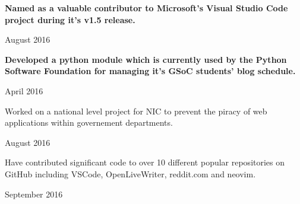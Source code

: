 
\begin{cvachievements}

\cvachievement%
  {%
    \begin{cvachievementitems}
      \item{\textbf{Named as a valuable contributor to Microsoft's Visual Studio Code
            project during it's v1.5 release.}} %
    \end{cvachievementitems}
  }
  {August 2016} %

\cvachievement%
  {%
    \begin{cvachievementitems}
      \item{\textbf{Developed a python module which is currently used by the Python
            Software Foundation for managing it's GSoC students' blog schedule.}} %
    \end{cvachievementitems}
  }
  {April 2016} %

\cvachievement%
  {%
    \begin{cvachievementitems}
      \item{Worked on a national level project for NIC to prevent the piracy of
            web applications within governement departments.} %
    \end{cvachievementitems}
  }
  {August 2016} %

\cvachievement%
  {%
    \begin{cvachievementitems}
      \item{Have contributed significant code to over 10 different popular
            repositories on GitHub including VSCode, OpenLiveWriter, reddit.com
            and neovim.} %
    \end{cvachievementitems}
  }
  {September 2016} %

\end{cvachievements}
